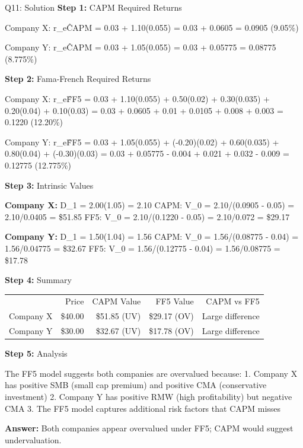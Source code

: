 \documentclass{beamer}
\renewcommand{\scriptsize}{\fontsize{6pt}{7pt}\selectfont}
\begin{document}
	\begin{frame}{Q11: Solution}
		\scriptsize
		\textbf{Step 1:} CAPM Required Returns
		
		Company X: r\_e\^{CAPM} = 0.03 + 1.10(0.055) = 0.03 + 0.0605 = 0.0905 (9.05\%)
		
		Company Y: r\_e\^{CAPM} = 0.03 + 1.05(0.055) = 0.03 + 0.05775 = 0.08775 (8.775\%)
		
		\vspace{2pt}
		\textbf{Step 2:} Fama-French Required Returns
		
		Company X:
		r\_e\^{FF5} = 0.03 + 1.10(0.055) + 0.50(0.02) + 0.30(0.035) + 0.20(0.04) + 0.10(0.03)
		= 0.03 + 0.0605 + 0.01 + 0.0105 + 0.008 + 0.003 = 0.1220 (12.20\%)
		
		Company Y:
		r\_e\^{FF5} = 0.03 + 1.05(0.055) + (-0.20)(0.02) + 0.60(0.035) + 0.80(0.04) + (-0.30)(0.03)
		= 0.03 + 0.05775 - 0.004 + 0.021 + 0.032 - 0.009 = 0.12775 (12.775\%)
		
		\vspace{2pt}
		\textbf{Step 3:} Intrinsic Values
		
		\textbf{Company X:}
		D\_1 = 2.00(1.05) = 2.10
		CAPM: V\_0 = 2.10/(0.0905 - 0.05) = 2.10/0.0405 = \$51.85
		FF5: V\_0 = 2.10/(0.1220 - 0.05) = 2.10/0.072 = \$29.17
		
		\textbf{Company Y:}
		D\_1 = 1.50(1.04) = 1.56
		CAPM: V\_0 = 1.56/(0.08775 - 0.04) = 1.56/0.04775 = \$32.67
		FF5: V\_0 = 1.56/(0.12775 - 0.04) = 1.56/0.08775 = \$17.78
		
		\vspace{2pt}
		\textbf{Step 4:} Summary
		
		\begin{tabular}{lrrrr}
			& Price & CAPM Value & FF5 Value & CAPM vs FF5 \\
			Company X & \$40.00 & \$51.85 (UV) & \$29.17 (OV) & Large difference \\
			Company Y & \$30.00 & \$32.67 (UV) & \$17.78 (OV) & Large difference \\
		\end{tabular}
		
		\vspace{2pt}
		\textbf{Step 5:} Analysis
		
		The FF5 model suggests both companies are overvalued because:
		1. Company X has positive SMB (small cap premium) and positive CMA (conservative investment)
		2. Company Y has positive RMW (high profitability) but negative CMA
		3. The FF5 model captures additional risk factors that CAPM misses
		
		\textbf{Answer:} Both companies appear overvalued under FF5; CAPM would suggest undervaluation.
	\end{frame}
	
\end{document}
